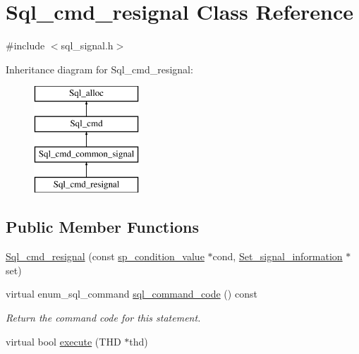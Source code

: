 \hypertarget{classSql__cmd__resignal}{}\section{Sql\+\_\+cmd\+\_\+resignal Class Reference}
\label{classSql__cmd__resignal}


{\ttfamily \#include $<$sql\+\_\+signal.\+h$>$}

Inheritance diagram for Sql\+\_\+cmd\+\_\+resignal\+:\begin{figure}[H]
\begin{center}
\leavevmode
\includegraphics[height=4.000000cm]{classSql__cmd__resignal}
\end{center}
\end{figure}
\subsection*{Public Member Functions}
\begin{DoxyCompactItemize}
\item 
\mbox{\hyperlink{classSql__cmd__resignal_a54565abda6241ad99d005593e0c246b6}{Sql\+\_\+cmd\+\_\+resignal}} (const \mbox{\hyperlink{classsp__condition__value}{sp\+\_\+condition\+\_\+value}} $\ast$cond, \mbox{\hyperlink{classSet__signal__information}{Set\+\_\+signal\+\_\+information}} $\ast$set)
\item 
\mbox{\label{classSql__cmd__resignal_a6e244d9820315cd1bf44c6408d941e56}} 
virtual enum\+\_\+sql\+\_\+command \mbox{\hyperlink{classSql__cmd__resignal_a6e244d9820315cd1bf44c6408d941e56}{sql\+\_\+command\+\_\+code}} () const
\begin{DoxyCompactList}\small\item\em Return the command code for this statement. \end{DoxyCompactList}\item 
virtual bool \mbox{\hyperlink{classSql__cmd__resignal_a90366018b66b37bf6fd101b01c49dbf2}{execute}} (T\+HD $\ast$thd)
\end{DoxyCompactItemize}
